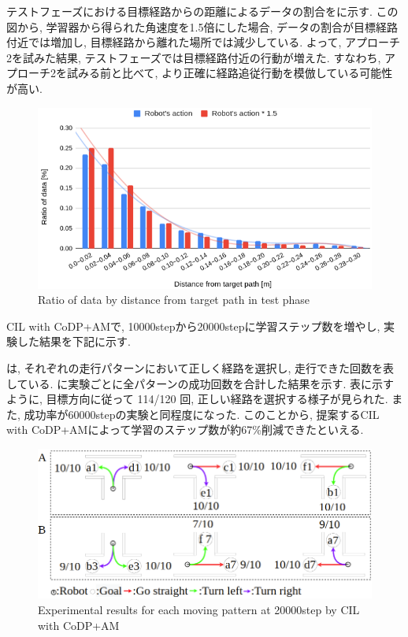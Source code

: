 
  テストフェーズにおける目標経路からの距離によるデータの割合をに示す. この図から, 学習器から得られた角速度を1.5倍にした場合, データの割合が目標経路付近では増加し, 目標経路から離れた場所では減少している. よって, アプローチ2を試みた結果, テストフェーズでは目標経路付近の行動が増えた. すなわち, アプローチ2を試みる前と比べて, より正確に経路追従行動を模倣している可能性が高い.

  \begin{figure}[hbtp]
    \centering
   \includegraphics[keepaspectratio, scale=0.37]
        {images/hist_act_test2.png}
   \caption{Ratio of data by distance from target path in test phase}
   \label{Fig:hist_act_test}
  \end{figure}  



CIL with CoDP+AMで, 10000stepから20000stepに学習ステップ数を増やし, 実験した結果を下記に示す.

は, それぞれの走行パターンにおいて正しく経路を選択し, 走行できた回数を表している.  に実験ごとに全パターンの成功回数を合計した結果を示す. 
表に示すように, 目標方向に従って 114/120 回, 正しい経路を選択する様子が見られた. また, 成功率が60000stepの実験と同程度になった. このことから, 提案するCIL with CoDP+AMによって学習のステップ数が約67\%削減できたといえる.

\begin{figure}[hbtp]
  \centering
 \includegraphics[keepaspectratio, scale=0.42]
      {images/20000step_act1.5.png}
 \caption{Experimental results for each moving pattern at 20000step by CIL with CoDP+AM}
 \label{Fig:20000step_act1.5}
\end{figure} 

